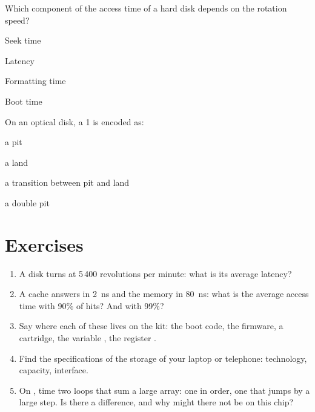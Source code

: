 \begin{quiz}{Which component of the access time of a hard disk depends on the rotation speed?}
\item Seek time
\item Latency
\item Formatting time
\item Boot time
\end{quiz}

\begin{quiz}{On an optical disk, a 1 is encoded as:}
\item a pit
\item a land
\item a transition between pit and land
\item a double pit
\end{quiz}

\section{Exercises}

\begin{exercise}
\begin{enumerate}[nosep]
\item A disk turns at 5\,400 revolutions per minute: what is its average
  latency?
\item A cache answers in 2~ns and the memory in 80~ns: what is the average
  access time with 90\% of hits? And with 99\%?
\item Say where each of these lives on the \prg kit: the boot code, the
  firmware, a cartridge, the variable , the register .
\item Find the specifications of the storage of your laptop or telephone:
  technology, capacity, interface.
\item On \prg, time two loops that sum a large array: one in order, one that
  jumps by a large step. Is there a difference, and why might there not be on
  this chip?
\end{enumerate}
\end{exercise}

